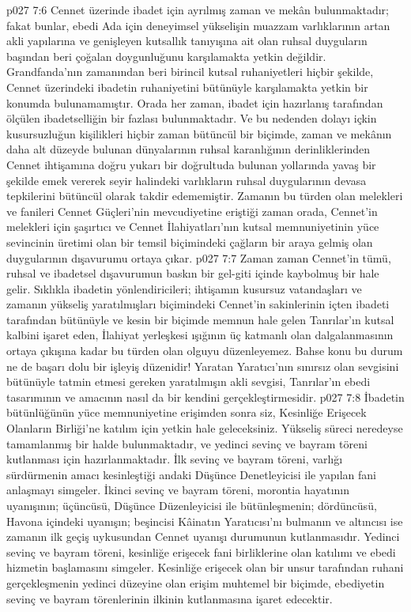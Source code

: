 \vs p027 7:6 Cennet üzerinde ibadet için ayrılmış zaman ve mekân bulunmaktadır; fakat bunlar, ebedi Ada için deneyimsel yükselişin muazzam varlıklarının artan akli yapılarına ve genişleyen kutsallık tanıyışına ait olan ruhsal duyguların başından beri çoğalan doygunluğunu karşılamakta yetkin değildir. Grandfanda’nın zamanından beri birincil kutsal ruhaniyetleri hiçbir şekilde, Cennet üzerindeki ibadetin ruhaniyetini bütünüyle karşılamakta yetkin bir konumda bulunamamıştır. Orada her zaman, ibadet için hazırlanış tarafından ölçülen ibadetselliğin bir fazlası bulunmaktadır. Ve bu nedenden dolayı içkin kusursuzluğun kişilikleri hiçbir zaman bütüncül bir biçimde, zaman ve mekânın daha alt düzeyde bulunan dünyalarının ruhsal karanlığının derinliklerinden Cennet ihtişamına doğru yukarı bir doğrultuda bulunan yollarında yavaş bir şekilde emek vererek seyir halindeki varlıkların ruhsal duygularının devasa tepkilerini bütüncül olarak takdir edememiştir. Zamanın bu türden olan melekleri ve fanileri Cennet Güçleri’nin mevcudiyetine eriştiği zaman orada, Cennet’in melekleri için şaşırtıcı ve Cennet İlahiyatları’nın kutsal memnuniyetinin yüce sevincinin üretimi olan bir temsil biçimindeki çağların bir araya gelmiş olan duygularının dışavurumu ortaya çıkar.
\vs p027 7:7 Zaman zaman Cennet’in tümü, ruhsal ve ibadetsel dışavurumun baskın bir gel\hyp{}giti içinde kaybolmuş bir hale gelir. Sıklıkla ibadetin yönlendiricileri; ihtişamın kusursuz vatandaşları ve zamanın yükseliş yaratılmışları biçimindeki Cennet’in sakinlerinin içten ibadeti tarafından bütünüyle ve kesin bir biçimde memnun hale gelen Tanrılar’ın kutsal kalbini işaret eden, İlahiyat yerleşkesi ışığının üç katmanlı olan dalgalanmasının ortaya çıkışına kadar bu türden olan olguyu düzenleyemez. Bahse konu bu durum ne de başarı dolu bir işleyiş düzenidir! Yaratan Yaratıcı’nın sınırsız olan sevgisini bütünüyle tatmin etmesi gereken yaratılmışın akli sevgisi, Tanrılar’ın ebedi tasarımının ve amacının nasıl da bir kendini gerçekleştirmesidir.
\vs p027 7:8 İbadetin bütünlüğünün yüce memnuniyetine erişimden sonra siz, Kesinliğe Erişecek Olanların Birliği’ne katılım için yetkin hale geleceksiniz. Yükseliş süreci neredeyse tamamlanmış bir halde bulunmaktadır, ve yedinci sevinç ve bayram töreni kutlanması için hazırlanmaktadır. İlk sevinç ve bayram töreni, varlığı sürdürmenin amacı kesinleştiği andaki Düşünce Denetleyicisi ile yapılan fani anlaşmayı simgeler. İkinci sevinç ve bayram töreni, morontia hayatının uyanışının; üçüncüsü, Düşünce Düzenleyicisi ile bütünleşmenin; dördüncüsü, Havona içindeki uyanışın; beşincisi Kâinatın Yaratıcısı’nı bulmanın ve altıncısı ise zamanın ilk geçiş uykusundan Cennet uyanışı durumunun kutlanmasıdır. Yedinci sevinç ve bayram töreni, kesinliğe erişecek fani birliklerine olan katılımı ve ebedi hizmetin başlamasını simgeler. Kesinliğe erişecek olan bir unsur tarafından ruhani gerçekleşmenin yedinci düzeyine olan erişim muhtemel bir biçimde, ebediyetin sevinç ve bayram törenlerinin ilkinin kutlanmasına işaret edecektir.
